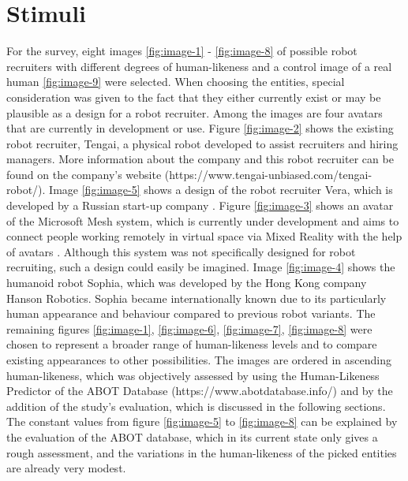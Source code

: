 \section{Stimuli}
For the survey, eight images \ref{fig:image-1} - \ref{fig:image-8} of possible robot recruiters with different degrees of human-likeness and a control image of a real human \ref{fig:image-9} were selected. When choosing the entities, special consideration was given to the fact that they either currently exist or may be plausible as a design for a robot recruiter. Among the images are four avatars that are currently in development or use. Figure \ref{fig:image-2} shows the existing robot recruiter, Tengai, a physical robot developed to assist recruiters and hiring managers. More information about the company and this robot recruiter can be found on the company's website (https://www.tengai-unbiased.com/tengai-robot/). Image \ref{fig:image-5} shows a design of the robot recruiter Vera, which is developed by a Russian start-up company \cite{vera}. Figure \ref{fig:image-3} shows an avatar of the Microsoft Mesh system, which is currently under development and aims to connect people working remotely in virtual space via Mixed Reality with the help of avatars \cite{microsoft_mesh}. Although this system was not specifically designed for robot recruiting, such a design could easily be imagined. Image \ref{fig:image-4} shows the humanoid robot Sophia, which was developed by the Hong Kong company Hanson Robotics. Sophia became internationally known due to its particularly human appearance and behaviour compared to previous robot variants. The remaining figures \ref{fig:image-1}, \ref{fig:image-6}, \ref{fig:image-7}, \ref{fig:image-8} were chosen to represent a broader range of human-likeness levels and to compare existing appearances to other possibilities. The images are ordered in ascending human-likeness, which was objectively assessed by using the Human-Likeness Predictor of the ABOT Database (https://www.abotdatabase.info/) and by the addition of the study's evaluation, which is discussed in the following sections. The constant values from figure \ref{fig:image-5} to \ref{fig:image-8} can be explained by the evaluation of the ABOT database, which in its current state only gives a rough assessment, and the variations in the human-likeness of the picked entities are already very modest.
\begin{table}[b!]
\centering
{}
\caption{Rated human-likeness of the figures.}
\label{tab:rated-human-likeness}
\end{table}
\newpage

